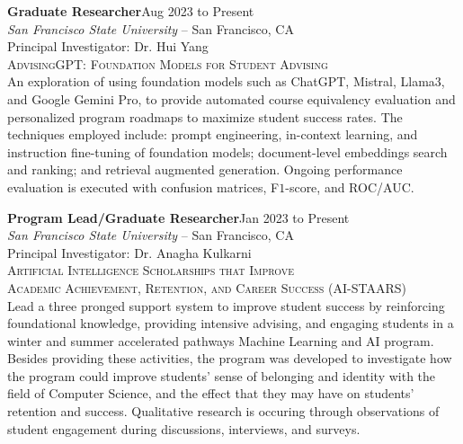 \documentclass[hidelinks, 10pt]{article}
\begin{document}
{{    %

    \hrulefill

    \vspace{4mm}

    \begin{minipage}[ct]{0.9\linewidth}
        \textbf{Graduate Researcher}\hfill Aug 2023 to Present\\
        \emph{San Francisco State University} -- San Francisco, CA\\
        Principal Investigator: Dr. Hui Yang\\
        {\textsc{AdvisingGPT: Foundation Models for Student Advising}}
        \vspace{1mm}\\
        An exploration of using foundation models such as ChatGPT, Mistral, Llama$3$, and Google
        Gemini Pro, to provide automated course equivalency evaluation and personalized
        program roadmaps to maximize student success rates. The techniques employed
        include: prompt engineering, in-context learning, and instruction fine-tuning of
        foundation models;
        document-level embeddings search and ranking; and retrieval augmented
        generation.  Ongoing performance evaluation is executed with
        confusion matrices, F$1$-score, and ROC/AUC.
    \end{minipage}

    \vspace{4mm}

    \begin{minipage}[ct]{0.9\linewidth}
        \textbf{Program Lead/Graduate Researcher}\hfill Jan 2023 to Present\\
        \emph{San Francisco State University} -- San Francisco, CA\\
        Principal Investigator: Dr. Anagha Kulkarni\\
        {\textsc{Artificial Intelligence Scholarships that Improve \\Academic Achievement, Retention, and Career Success (AI-STAARS)}}
        \vspace{1mm}\\
        Lead a three pronged support system to improve student success by reinforcing
        foundational knowledge, providing intensive advising, and engaging students in a
        winter and summer accelerated pathways Machine Learning and AI program.  Besides providing these
        activities, the program was developed to investigate how the program could improve
        students' sense of belonging and identity with the field of Computer Science,
        and the effect that they may have on students' retention and success.
        Qualitative research is occuring through observations of student engagement
        during discussions, interviews, and surveys.
    \end{minipage}

}}
\end{document}
